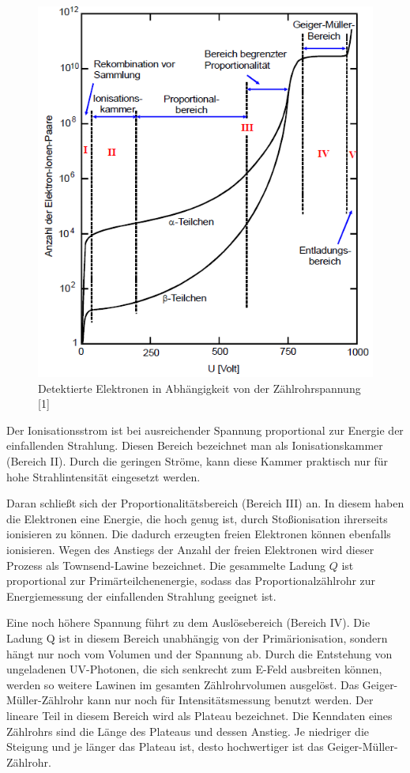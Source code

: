 \begin{figure}
  \centering
  \includegraphics[scale=0.6]{content/Bereiche.pg.png}
  \caption{Detektierte Elektronen in Abhängigkeit von der Zählrohrspannung [1]}
  \label{fig:Elektronen}
\end{figure}

Der Ionisationsstrom ist bei ausreichender Spannung proportional zur Energie 
der einfallenden Strahlung. Diesen Bereich bezeichnet man als Ionisationskammer
(Bereich II). Durch die geringen Ströme, kann diese Kammer praktisch nur für hohe 
Strahlintensität eingesetzt werden. 

Daran schließt sich der Proportionalitätsbereich (Bereich III) an. In diesem haben
die Elektronen eine Energie, die hoch genug ist, durch Stoßionisation ihrerseits
ionisieren zu können. Die dadurch erzeugten freien Elektronen können ebenfalls
ionisieren. Wegen des Anstiegs der Anzahl der freien Elektronen wird dieser Prozess
als Townsend-Lawine bezeichnet. Die gesammelte Ladung $Q$ ist proportional zur
Primärteilchenenergie, sodass das Proportionalzählrohr zur Energiemessung der 
einfallenden Strahlung geeignet ist. 

Eine noch höhere Spannung führt zu dem Auslösebereich (Bereich IV). Die Ladung Q 
ist in diesem Bereich unabhängig von der Primärionisation, sondern hängt nur noch
vom Volumen und der Spannung ab. Durch die Entstehung von ungeladenen UV-Photonen, 
die sich senkrecht zum E-Feld ausbreiten können, werden so weitere Lawinen im 
gesamten Zählrohrvolumen ausgelöst. Das Geiger-Müller-Zählrohr kann nur noch für
Intensitätsmessung benutzt werden. Der lineare Teil in diesem Bereich wird als
Plateau bezeichnet. 
Die Kenndaten eines Zählrohrs sind die Länge des Plateaus und dessen Anstieg. Je
niedriger die Steigung und je länger das Plateau ist, desto hochwertiger ist das
Geiger-Müller-Zählrohr. 

